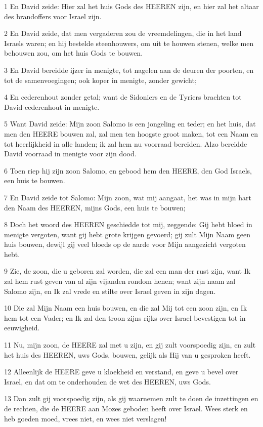 \par 1 En David zeide: Hier zal het huis Gods des HEEREN zijn, en hier zal het altaar des brandoffers voor Israel zijn.
\par 2 En David zeide, dat men vergaderen zou de vreemdelingen, die in het land Israels waren; en hij bestelde steenhouwers, om uit te houwen stenen, welke men behouwen zou, om het huis Gods te bouwen.
\par 3 En David bereidde ijzer in menigte, tot nagelen aan de deuren der poorten, en tot de samenvoegingen; ook koper in menigte, zonder gewicht;
\par 4 En cederenhout zonder getal; want de Sidoniers en de Tyriers brachten tot David cederenhout in menigte.
\par 5 Want David zeide: Mijn zoon Salomo is een jongeling en teder; en het huis, dat men den HEERE bouwen zal, zal men ten hoogste groot maken, tot een Naam en tot heerlijkheid in alle landen; ik zal hem nu voorraad bereiden. Alzo bereidde David voorraad in menigte voor zijn dood.
\par 6 Toen riep hij zijn zoon Salomo, en gebood hem den HEERE, den God Israels, een huis te bouwen.
\par 7 En David zeide tot Salomo: Mijn zoon, wat mij aangaat, het was in mijn hart den Naam des HEEREN, mijns Gods, een huis te bouwen;
\par 8 Doch het woord des HEEREN geschiedde tot mij, zeggende: Gij hebt bloed in menigte vergoten, want gij hebt grote krijgen gevoerd; gij zult Mijn Naam geen huis bouwen, dewijl gij veel bloeds op de aarde voor Mijn aangezicht vergoten hebt.
\par 9 Zie, de zoon, die u geboren zal worden, die zal een man der rust zijn, want Ik zal hem rust geven van al zijn vijanden rondom henen; want zijn naam zal Salomo zijn, en Ik zal vrede en stilte over Israel geven in zijn dagen.
\par 10 Die zal Mijn Naam een huis bouwen, en die zal Mij tot een zoon zijn, en Ik hem tot een Vader; en Ik zal den troon zijns rijks over Israel bevestigen tot in eeuwigheid.
\par 11 Nu, mijn zoon, de HEERE zal met u zijn, en gij zult voorspoedig zijn, en zult het huis des HEEREN, uws Gods, bouwen, gelijk als Hij van u gesproken heeft.
\par 12 Alleenlijk de HEERE geve u kloekheid en verstand, en geve u bevel over Israel, en dat om te onderhouden de wet des HEEREN, uws Gods.
\par 13 Dan zult gij voorspoedig zijn, als gij waarnemen zult te doen de inzettingen en de rechten, die de HEERE aan Mozes geboden heeft over Israel. Wees sterk en heb goeden moed, vrees niet, en wees niet verslagen!
